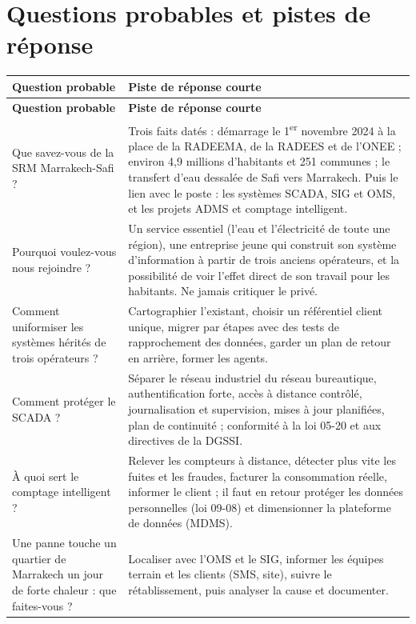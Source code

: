 \section{Questions probables et pistes de réponse}

{\small
\begin{longtable}{|>{\raggedright\arraybackslash\hspace{0pt}}p{5.2cm}|>{\raggedright\arraybackslash\hspace{0pt}}p{8.8cm}|}
\hline
\rowcolor{gray!20} \textbf{Question probable} & \textbf{Piste de réponse courte} \\ \hline
\endfirsthead
\hline
\rowcolor{gray!20} \textbf{Question probable} & \textbf{Piste de réponse courte} \\ \hline
\endhead

Que savez-vous de la SRM Marrakech-Safi ? & Trois faits datés : démarrage le 1\textsuperscript{er} novembre 2024 à la place de la RADEEMA, de la RADEES et de l'ONEE ; environ 4,9 millions d'habitants et 251 communes ; le transfert d'eau dessalée de Safi vers Marrakech. Puis le lien avec le poste : les systèmes SCADA, SIG et OMS, et les projets ADMS et comptage intelligent. \\ \hline

Pourquoi voulez-vous nous rejoindre ? & Un service essentiel (l'eau et l'électricité de toute une région), une entreprise jeune qui construit son système d'information à partir de trois anciens opérateurs, et la possibilité de voir l'effet direct de son travail pour les habitants. Ne jamais critiquer le privé. \\ \hline

Comment uniformiser les systèmes hérités de trois opérateurs ? & Cartographier l'existant, choisir un référentiel client unique, migrer par étapes avec des tests de rapprochement des données, garder un plan de retour en arrière, former les agents. \\ \hline

Comment protéger le SCADA ? & Séparer le réseau industriel du réseau bureautique, authentification forte, accès à distance contrôlé, journalisation et supervision, mises à jour planifiées, plan de continuité ; conformité à la loi 05-20 et aux directives de la DGSSI. \\ \hline

À quoi sert le comptage intelligent ? & Relever les compteurs à distance, détecter plus vite les fuites et les fraudes, facturer la consommation réelle, informer le client ; il faut en retour protéger les données personnelles (loi 09-08) et dimensionner la plateforme de données (MDMS). \\ \hline

Une panne touche un quartier de Marrakech un jour de forte chaleur : que faites-vous ? & Localiser avec l'OMS et le SIG, informer les équipes terrain et les clients (SMS, site), suivre le rétablissement, puis analyser la cause et documenter. \\ \hline

\end{longtable}
}

